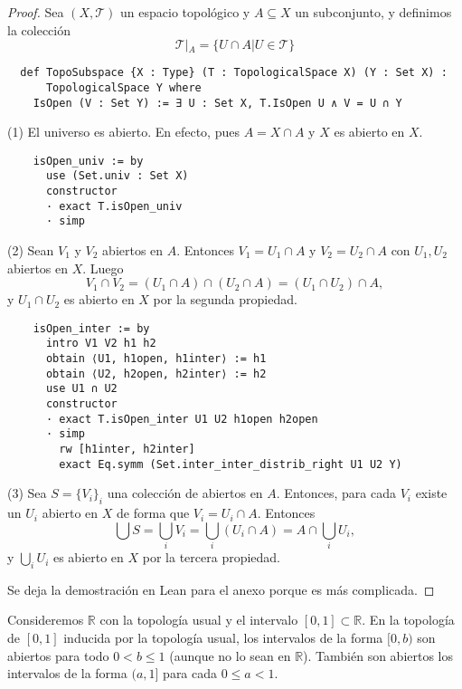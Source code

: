 \begin{proof}
  Sea $(X, \mathcal{T})$ un espacio topológico y $A \subseteq X$ un subconjunto, y definimos la colección
  $$
  \mathcal{T}|_A = \{U \cap A | U \in \mathcal{T}\}
  $$

  \begin{lstlisting}
  def TopoSubspace {X : Type} (T : TopologicalSpace X) (Y : Set X) :
      TopologicalSpace Y where
    IsOpen (V : Set Y) := ∃ U : Set X, T.IsOpen U ∧ V = U ∩ Y \end{lstlisting}
  
  (1) El universo es abierto. En efecto, pues $A = X \cap A$ y $X$ es abierto en $X$.
  
  \begin{lstlisting}
    isOpen_univ := by
      use (Set.univ : Set X)
      constructor
      · exact T.isOpen_univ
      · simp \end{lstlisting}
  
  (2) Sean $V_1$ y $V_2$ abiertos en $A$. Entonces $V_1 = U_1 \cap A$ y $V_2 = U_2 \cap A$ con $U_1, U_2$ abiertos en $X$. Luego
  $$
  V_1 \cap V_2 = (U_1 \cap A) \cap (U_2 \cap A) = (U_1 \cap U_2) \cap A,
  $$
  y $U_1 \cap U_2$ es abierto en $X$ por la segunda propiedad.

  \begin{lstlisting}
    isOpen_inter := by
      intro V1 V2 h1 h2
      obtain ⟨U1, h1open, h1inter⟩ := h1
      obtain ⟨U2, h2open, h2inter⟩ := h2
      use U1 ∩ U2
      constructor
      · exact T.isOpen_inter U1 U2 h1open h2open
      · simp
        rw [h1inter, h2inter]
        exact Eq.symm (Set.inter_inter_distrib_right U1 U2 Y) \end{lstlisting}
  
  (3) Sea $S = \{V_i\}_i$ una colección de abiertos en $A$. Entonces, para cada $V_i$ existe un $U_i$ abierto en $X$ de forma que $V_i = U_i \cap A$. Entonces
  $$
  \bigcup S = \bigcup_{i}V_i = \bigcup_{i}(U_i \cap A) = A \cap \bigcup_{i}U_i,
  $$
  y $\bigcup_{i}U_i$ es abierto en $X$ por la tercera propiedad.

  Se deja la demostración en Lean para el anexo porque es más complicada.
\end{proof}

\begin{example}
  Consideremos $\mathbb{R}$ con la topología usual y el intervalo $[0, 1] \subset \mathbb{R}$. En la topología de $[0, 1]$ inducida por la topología usual, los intervalos de la forma $[0, b)$ son abiertos para todo $0 < b \leq 1$ (aunque no lo sean en $\mathbb{R}$). También son abiertos los intervalos de la forma $(a, 1]$ para cada $0 \leq a < 1$.
\end{example}


